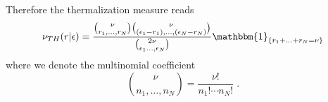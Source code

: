 \documentclass[10pt]{article}
\numberwithin{equation}{section}
\numberwithin{equation}{subsection}
\newcommand{\dt}{\;.}
\begin{document}
Therefore the thermalization measure reads
\begin{equation}
	\begin{split}
	\nu_{TH}(r|\epsilon)=\frac{\binom{\nu}{r_{1},\ldots,r_{N}}\binom{\nu}{(\epsilon_{1}-r_{1}),\ldots,(\epsilon_{N}-r_{N})}}{\binom{2\nu}{\epsilon_{1}\ldots,\epsilon_{N}}}\mathbbm{1}_{\{r_{1}+\ldots+r_{N}=\nu\}}
	\end{split}
\end{equation}
where we denote the multinomial coefficient
\begin{equation}
	\binom{\nu}{n_{1},\ldots,n_{N}}=\frac{\nu!}{n_{1}!\cdots n_{N}!}\dt
\end{equation}
\end{document}
